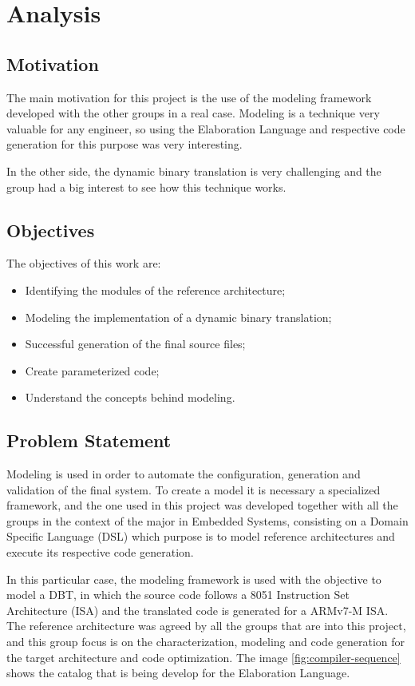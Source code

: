 \documentclass[11pt]{report}
\begin{document}
\chapter{Analysis}

	\section{Motivation}
	
	\par The main motivation for this project is the use of the modeling framework developed with the other groups in a real case. Modeling is a technique very valuable for any engineer, so using the Elaboration Language and respective code generation for this purpose was very interesting. 
	\par In the other side, the dynamic binary translation is very challenging and the group had a big interest to see how this technique works.

	\section{Objectives}
	
	\par The objectives of this work are:
	\begin{itemize}
		\item Identifying the modules of the reference architecture;
		\item Modeling the implementation of a dynamic binary translation;
		\item Successful generation of the final source files;
		\item Create parameterized code;
		\item Understand the concepts behind modeling.
	\end{itemize}

	\section{Problem Statement}
	
	\par Modeling is used in order to automate the configuration, generation and validation of the final system. To create a model it is necessary a specialized framework, and the one used in this project was developed together with all the groups in the context of the major in Embedded Systems, consisting on a Domain Specific Language (DSL) which purpose is to model reference architectures and execute its respective code generation. 
	\par In this particular case, the modeling framework is used with the objective to model a DBT, in which the source code follows a 8051 Instruction Set Architecture (ISA) and the translated code is generated for a ARMv7-M ISA.  The reference architecture was agreed by all the groups that are into this project, and this group focus is on the characterization, modeling and code generation for the target architecture and code optimization. The image \ref{fig:compiler-sequence} shows the catalog that is being develop for the Elaboration Language.
	
\end{document}
